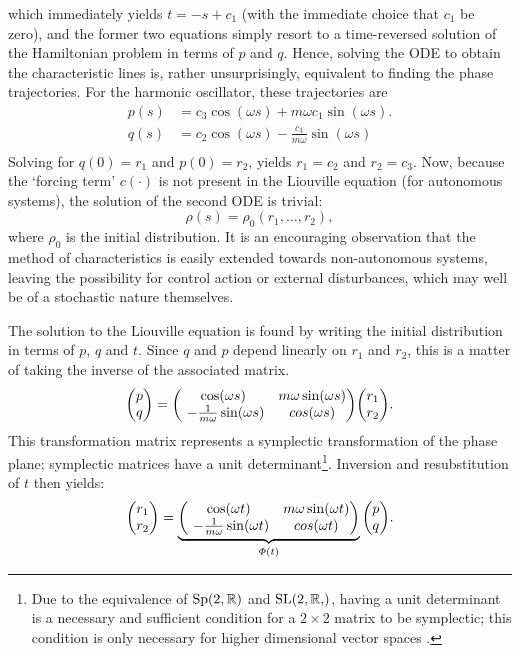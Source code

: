 which immediately yields $t = -s + c_1$ (with the immediate choice that $c_1$ be zero), and the former two equations simply resort to a time-reversed solution of the Hamiltonian problem in terms of $p$ and $q$. Hence, solving the ODE to obtain the characteristic lines is, rather unsurprisingly, equivalent to finding the phase trajectories. For the harmonic oscillator, these trajectories are
\begin{equation}
    \begin{split}
        p(s) &= c_3\cos(\omega s) + m\omega c_1 \sin(\omega s). \\
        q(s) &= c_2\cos(\omega s) - \frac{c_3}{m\omega}\sin(\omega s)\\
    \end{split}
\end{equation}
Solving for $q(0) = r_1$ and $p(0) = r_2$, yields $r_1 = c_2$ and $r_2 = c_3$. Now, because the `forcing term' $c(\cdot)$ is not present in the Liouville equation (for autonomous systems), the solution of the second ODE is trivial:
$$ \rho(s) = \rho_0(r_1, \ldots, r_2), $$
where $\rho_0$ is the initial distribution. It is an encouraging observation that the method of characteristics is easily extended towards non-autonomous systems, leaving the possibility for control action or external disturbances, which may well be of a stochastic nature themselves.

The solution to the Liouville equation is found by writing the initial distribution in terms of $p$, $q$ and $t$. Since $q$ and $p$ depend linearly on $r_1$ and $r_2$, this is a matter of taking the inverse of the associated matrix.
$$ \mqty(p\\q) = 
    \mqty( \cos(\omega s) & m\omega \sin(\omega s) \\\  -\frac{1}{m\omega}\sin(\omega s) & cos(\omega s) )\mqty(r_1\\r_2).  $$
This transformation matrix represents a symplectic transformation of the phase plane; symplectic matrices have a unit determinant\footnote{Due to the equivalence of $\mathrm{Sp}(2, \mathbb{R})$ and $\slgroup{2, \real}$, having a unit determinant is a necessary and sufficient condition for a $2\times2$ matrix to be symplectic; this condition is only necessary for higher dimensional vector spaces \cite{Arnold1989}.}. Inversion and resubstitution of $t$ then yields:
$$ \mqty(r_1\\r_2) = \underbrace{\mqty( \cos(\omega t) & m\omega \sin(\omega t) \\\  -\frac{1}{m\omega}\sin(\omega t) & cos(\omega t) )}_{\Phi(t)}\mqty(p\\q).$$

